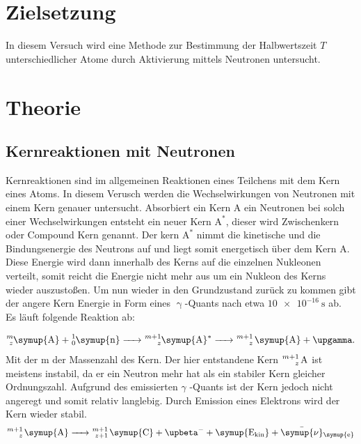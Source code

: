 \section{Zielsetzung}
In diesem Versuch wird eine Methode zur Bestimmung der Halbwertszeit $T$ unterschiedlicher Atome durch Aktivierung mittels Neutronen untersucht.


\section{Theorie}

\subsection{Kernreaktionen mit Neutronen}

\noindent Kernreaktionen sind im allgemeinen Reaktionen eines Teilchens mit dem Kern eines Atoms. In diesem Verusch werden die Wechselwirkungen 
von Neutronen mit einem Kern genauer untersucht. Absorbiert ein Kern A ein Neutronen bei solch einer Wechselwirkungen entsteht ein neuer Kern
$\text{A}^{\ast}$, dieser wird Zwischenkern oder Compound Kern genannt. Der kern $\text{A}^{\ast}$ nimmt die kinetische und die Bindungsenergie 
des Neutrons auf und liegt somit energetisch über dem Kern A. Diese Energie wird dann innerhalb des Kerns auf die einzelnen Nukleonen verteilt, 
somit reicht die Energie nicht mehr aus um ein Nukleon des Kerns wieder auszustoßen. Um nun wieder in den Grundzustand zurück zu kommen gibt der 
angere Kern Energie in Form eines $\upgamma$-Quants nach etwa $\SI{10e-16}{\second}$ ab.\\
Es läuft folgende Reaktion ab:

\begin{equation*}
   \ce{^m_z\symup{A} + ^1_0\symup{n} -> ^{m+1}_z\symup{A}^{\ast} -> ^{m+1}_z \symup{A} + \upgamma }. \nonumber
\end{equation*}
Mit der m der Massenzahl des Kern. Der hier entstandene Kern $\ce{^{m+1}_z \text{A}}$ ist meistens instabil, da er ein Neutron mehr hat als ein 
stabiler Kern gleicher Ordnungszahl. Aufgrund des emissierten $\gamma$ -Quants ist der Kern jedoch nicht angeregt und somit relativ langlebig.
Durch Emission eines Elektrons wird der Kern wieder stabil.
\begin{equation*}
   \ce{^{m+1}_z \symup{A} -> ^{m+1}_{z+1} \symup{C} + \upbeta^- + \symup{E_{kin}} + \bar{\symup{\nu}}_{\symup{e}}} \nonumber
\end{equation*}

